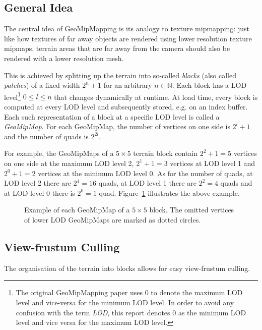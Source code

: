 \subsection{General Idea}
The central idea of GeoMipMapping is its analogy to texture mipmapping: just like how textures of far away objects are rendered using lower resolution texture mipmaps,
terrain areas that are far away from the camera should also be rendered with a lower resolution mesh.

This is achieved by splitting up the terrain into so-called \textit{blocks} (also called \textit{patches}) of a fixed width $2^n + 1$ for an arbitrary $n \in \mathbb{N}$.
Each block has a LOD level\footnote{The original GeoMipMapping paper uses 0 to denote the maximum LOD level and vice-versa for the minimum LOD level. In order to avoid any confusion with the term \textit{LOD}, this report denotes 0 as the minimum LOD level and vice versa for the maximum LOD level.} $0\leq l \leq n$ that changes dynamically at runtime.
At load time, every block is computed at every LOD level and subsequently stored, e.g. on an index buffer.
Each such representation of a block at a specific LOD level is called a \textit{GeoMipMap}.
For each GeoMipMap, the number of vertices on one side is $2^{l}+1$ and the number of quads is $2^{2l}$.

For example, the GeoMipMaps of a $5 \times 5$ terrain block contain $2^2 + 1 = 5$ vertices on one side at the maximum LOD level 2, $2^1 + 1 = 3$ vertices at LOD level 1 and $2^0 + 1 = 2$ vertices at the minimum LOD level 0.
As for the number of quads, at LOD level 2 there are $2^{4} = 16$ quads, at LOD level 1 there are $2^2 = 4$ quads and at LOD level 0 there is $2^0 = 1$ quad.
Figure~\ref{fig:geomipmapping-patch-example} illustrates the above example.

\begin{figure}[H]
  \centering
  \qquad
  \qquad
  \caption{Example of each GeoMipMap of a $5 \times 5$ block. The omitted vertices of lower LOD GeoMipMaps are marked as dotted circles.}\label{fig:geomipmapping-patch-example}
\end{figure}

\subsection{View-frustum Culling}
The organisation of the terrain into blocks allows for easy view-frustum culling.

